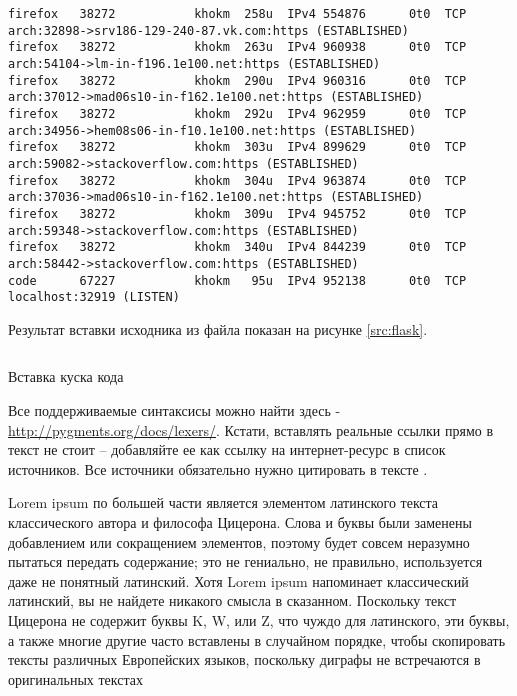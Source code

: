 \begin{codewrap}
\begin{verbatim}
firefox   38272           khokm  258u  IPv4 554876      0t0  TCP arch:32898->srv186-129-240-87.vk.com:https (ESTABLISHED)
firefox   38272           khokm  263u  IPv4 960938      0t0  TCP arch:54104->lm-in-f196.1e100.net:https (ESTABLISHED)
firefox   38272           khokm  290u  IPv4 960316      0t0  TCP arch:37012->mad06s10-in-f162.1e100.net:https (ESTABLISHED)
firefox   38272           khokm  292u  IPv4 962959      0t0  TCP arch:34956->hem08s06-in-f10.1e100.net:https (ESTABLISHED)
firefox   38272           khokm  303u  IPv4 899629      0t0  TCP arch:59082->stackoverflow.com:https (ESTABLISHED)
firefox   38272           khokm  304u  IPv4 963874      0t0  TCP arch:37036->mad06s10-in-f162.1e100.net:https (ESTABLISHED)
firefox   38272           khokm  309u  IPv4 945752      0t0  TCP arch:59348->stackoverflow.com:https (ESTABLISHED)
firefox   38272           khokm  340u  IPv4 844239      0t0  TCP arch:58442->stackoverflow.com:https (ESTABLISHED)
code      67227           khokm   95u  IPv4 952138      0t0  TCP localhost:32919 (LISTEN)      
\end{verbatim}
\caption{}\label{src:lsof}
\end{codewrap}

Результат вставки исходника из файла показан на рисунке \ref{src:flask}.

\begin{codewrap}
    \inputminted[fontsize=\footnotesize]{python}{source.py}
    \caption{Вставка куска кода}\label{src:flask}
\end{codewrap}

Все поддерживаемые синтаксисы можно найти здесь -
\url{http://pygments.org/docs/lexers/}. Кстати, вставлять реальные ссылки прямо
в текст не стоит -- добавляйте ее как ссылку на интернет-ресурс в список
источников. Все источники обязательно нужно цитировать в тексте
\cite{бобаренко2018отсечение}.

\conclusion
Lorem ipsum по большей части является элементом латинского текста классического
автора и философа Цицерона. Слова и буквы были заменены добавлением или
сокращением элементов, поэтому будет совсем неразумно пытаться передать
содержание; это не гениально, не правильно, используется даже не понятный
латинский. Хотя Lorem ipsum напоминает классический латинский, вы не найдете
никакого смысла в сказанном. Поскольку текст Цицерона не содержит буквы K, W,
или Z, что чуждо для латинского, эти буквы, а также многие другие часто
вставлены в случайном порядке, чтобы скопировать тексты различных Европейских
языков, поскольку диграфы не встречаются в оригинальных текстах

